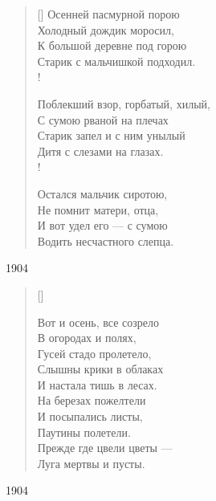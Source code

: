 \settowidth{\versewidth}{Осенней пасмурной порою}
\begin{verse}[\versewidth]
Осенней пасмурной порою\\
Холодный дождик моросил,\\
К большой деревне под горою\\
Старик с мальчишкой подходил.\\!

Поблекший взор, горбатый, хилый,\\
С сумою рваной на плечах\\
Старик запел и с ним унылый\\
Дитя с слезами на глазах.\\!

Остался мальчик сиротою,\\
Не помнит матери, отца,\\
И вот удел его --- с сумою\\
Водить несчастного слепца.
\end{verse}
1904

\settowidth{\versewidth}{Вот и осень, все созрело}
\begin{verse}[\versewidth]
\begin{patverse*}
Вот и осень, все созрело\\
В огородах и полях,\\
Гусей стадо пролетело,\\
Слышны крики в облаках\\
И настала тишь в лесах.\\
На березах пожелтели\\
И посыпались листы,\\
Паутины полетели.\\
Прежде где цвели цветы ---\\
Луга мертвы и пусты.
\end{patverse*}
\end{verse}
1904



